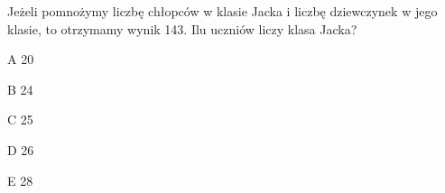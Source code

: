 \begin{tresc}
Jeżeli pomnożymy liczbę chłopców w klasie Jacka i liczbę dziewczynek w jego klasie, to otrzymamy wynik 143. Ilu uczniów liczy klasa Jacka?
\end{tresc}
\begin{wariant}{A} 20 \end{wariant}
\begin{wariant}{B} 24 \end{wariant}
\begin{wariant}{C} 25 \end{wariant}
\begin{wariant}{D} 26 \end{wariant}
\begin{wariant}{E} 28 \end{wariant}
